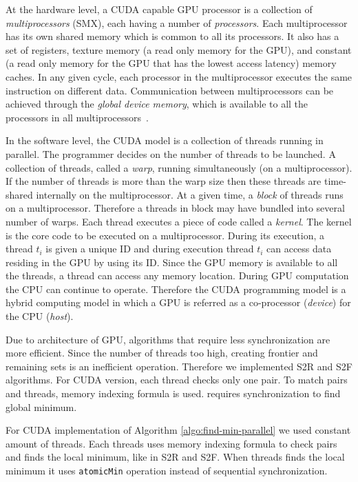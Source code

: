 \documentclass[12pt]{article}
\begin{document}
At the hardware level, a CUDA capable GPU processor is a collection of
\textit{multiprocessors} (SMX), each having a number of
\textit{processors}.  Each multiprocessor has its own shared memory
which is common to all its processors.  It also has a set of
registers, texture memory (a read only memory for the GPU), and
constant (a read only memory for the GPU that has the lowest access
latency) memory caches.  In any given cycle, each processor in the
multiprocessor executes the same instruction on different data.
Communication between multiprocessors can be achieved through the
\textit{global device memory}, which is available to all the
processors in all multiprocessors~\cite{nvidia}.

In the software level, the CUDA model is a collection of threads
running in parallel.  The programmer decides on the number of threads
to be launched.  A collection of threads, called a \textit{warp},
running simultaneously (on a multiprocessor).  If the number of
threads is more than the warp size then these threads are time-shared
internally on the multiprocessor.  At a given time, a \textit{block}
of threads runs on a multiprocessor.  Therefore a threads in block may
have bundled into several number of warps.  Each thread executes a
piece of code called a \textit{kernel}.  The kernel is the core code
to be executed on a multiprocessor.  During its execution, a thread
$t_i$ is given a unique ID and during execution thread $t_i$ can
access data residing in the GPU by using its ID.  Since the GPU memory
is available to all the threads, a thread can access any memory
location.  During GPU computation the CPU can continue to operate.
Therefore the CUDA programming model is a hybrid computing model in
which a GPU is referred as a co-processor (\textit{device}) for the
CPU (\textit{host}).

Due to architecture of GPU, algorithms that require less synchronization are more efficient. Since the number of threads too high, creating frontier and remaining sets is an inefficient operation. Therefore we implemented S2R and S2F algorithms. For CUDA version, each thread checks only one pair. To match pairs and threads, memory indexing formula is used.  requires synchronization to find global minimum.

For CUDA implementation of Algorithm \ref{algo:find-min-parallel} we used constant amount of threads. Each threads uses memory indexing formula to check pairs and finds the local minimum, like in S2R and S2F. When threads finds the local minimum it uses {\tt atomicMin} operation instead of sequential synchronization. 
\end{document}
